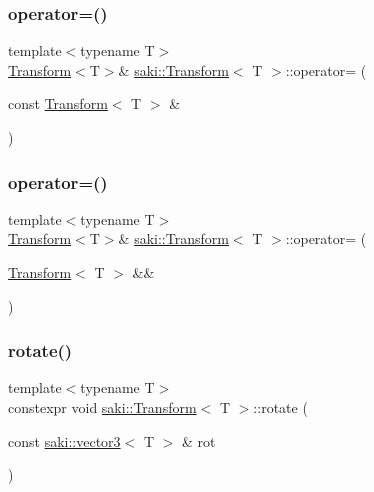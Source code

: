 \subsubsection{\texorpdfstring{operator=()}{operator=()}\hspace{0.1cm}{\footnotesize\ttfamily [1/2]}}
{\footnotesize\ttfamily template$<$typename T$>$ \\
\mbox{\hyperlink{classsaki_1_1_transform}{Transform}}$<$T$>$\& \mbox{\hyperlink{classsaki_1_1_transform}{saki\+::\+Transform}}$<$ T $>$\+::operator= (\begin{DoxyParamCaption}\item[{const \mbox{\hyperlink{classsaki_1_1_transform}{Transform}}$<$ T $>$ \&}]{ }\end{DoxyParamCaption})\hspace{0.3cm}{\ttfamily [default]}}

\mbox{\label{classsaki_1_1_transform_a66ea10234a845d96e63bbb9c2a1050eb}} 
\subsubsection{\texorpdfstring{operator=()}{operator=()}\hspace{0.1cm}{\footnotesize\ttfamily [2/2]}}
{\footnotesize\ttfamily template$<$typename T$>$ \\
\mbox{\hyperlink{classsaki_1_1_transform}{Transform}}$<$T$>$\& \mbox{\hyperlink{classsaki_1_1_transform}{saki\+::\+Transform}}$<$ T $>$\+::operator= (\begin{DoxyParamCaption}\item[{\mbox{\hyperlink{classsaki_1_1_transform}{Transform}}$<$ T $>$ \&\&}]{ }\end{DoxyParamCaption})\hspace{0.3cm}{\ttfamily [default]}}

\mbox{\label{classsaki_1_1_transform_a596353b58da1c694813ad31d1ea2bc06}} 
\subsubsection{\texorpdfstring{rotate()}{rotate()}\hspace{0.1cm}{\footnotesize\ttfamily [1/2]}}
{\footnotesize\ttfamily template$<$typename T$>$ \\
constexpr void \mbox{\hyperlink{classsaki_1_1_transform}{saki\+::\+Transform}}$<$ T $>$\+::rotate (\begin{DoxyParamCaption}\item[{const \mbox{\hyperlink{classsaki_1_1vector3}{saki\+::vector3}}$<$ T $>$ \&}]{rot }\end{DoxyParamCaption})\hspace{0.3cm}{\ttfamily [inline]}}



